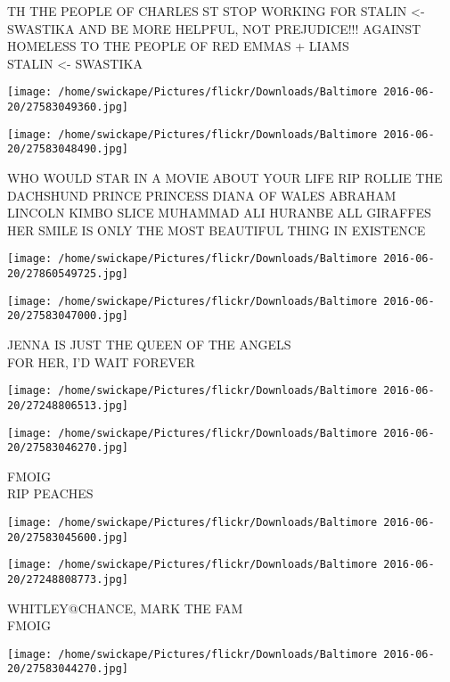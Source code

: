 \documentclass[10pt,letterpaper]{article}
\begin{document}
TH THE PEOPLE OF CHARLES ST STOP WORKING FOR STALIN <{-} SWASTIKA AND BE MORE HELPFUL, NOT PREJUDICE!!! AGAINST HOMELESS TO THE PEOPLE OF RED EMMAS + LIAMS\\
STALIN <{-} SWASTIKA
\pagebreak

\texttt{[image: /home/swickape/Pictures/flickr/Downloads/Baltimore 2016-06-20/27583049360.jpg]}

\vspace{0.25in}
\texttt{[image: /home/swickape/Pictures/flickr/Downloads/Baltimore 2016-06-20/27583048490.jpg]}

WHO WOULD STAR IN A MOVIE ABOUT YOUR LIFE RIP ROLLIE THE DACHSHUND PRINCE PRINCESS DIANA OF WALES ABRAHAM LINCOLN KIMBO SLICE MUHAMMAD ALI HURANBE ALL GIRAFFES\\
HER SMILE IS ONLY THE MOST BEAUTIFUL THING IN  EXISTENCE
\pagebreak

\texttt{[image: /home/swickape/Pictures/flickr/Downloads/Baltimore 2016-06-20/27860549725.jpg]}

\vspace{0.25in}
\texttt{[image: /home/swickape/Pictures/flickr/Downloads/Baltimore 2016-06-20/27583047000.jpg]}

JENNA IS JUST THE QUEEN OF THE ANGELS\\
FOR HER, I'D WAIT FOREVER
\pagebreak

\texttt{[image: /home/swickape/Pictures/flickr/Downloads/Baltimore 2016-06-20/27248806513.jpg]}

\vspace{0.25in}
\texttt{[image: /home/swickape/Pictures/flickr/Downloads/Baltimore 2016-06-20/27583046270.jpg]}

FMOIG\\
RIP PEACHES
\pagebreak

\texttt{[image: /home/swickape/Pictures/flickr/Downloads/Baltimore 2016-06-20/27583045600.jpg]}

\vspace{0.25in}
\texttt{[image: /home/swickape/Pictures/flickr/Downloads/Baltimore 2016-06-20/27248808773.jpg]}

WHITLEY@CHANCE, MARK THE FAM\\
FMOIG
\pagebreak

\texttt{[image: /home/swickape/Pictures/flickr/Downloads/Baltimore 2016-06-20/27583044270.jpg]}
\end{document}
